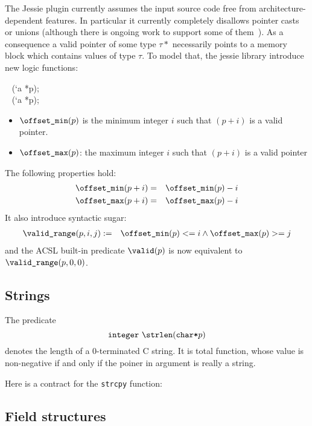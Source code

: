 The Jessie plugin currently assumes the input source code free from
architecture-dependent features. In particular it currently completely
disallows pointer casts or unions (although there is ongoing work to
support some of them~\cite{moy07ccpp}). As a consequence a valid
pointer of some type $\tau*$ necessarily points to a memory block
which contains values of type $\tau$. To model that, the jessie library introduce new logic functions:
\begin{flushleft}
\integer ~ \offsetmin(`a *p); \\
\integer ~ \offsetmax(`a *p);
\end{flushleft}

\begin{itemize}
\item $\texttt{{\textbackslash}offset\_min}(p)$ is the minimum integer $i$ such that $(p+i)$ is a
  valid pointer.

\item $\texttt{{\textbackslash}offset\_max}(p)$: the maximum integer $i$ such that $(p+i)$ is a
  valid pointer
\end{itemize}
The following properties hold:
\begin{eqnarray*}
\texttt{{\textbackslash}offset\_min}(p+i) &=& \texttt{{\textbackslash}offset\_min}(p)-i \\
\texttt{{\textbackslash}offset\_max}(p+i) &=& \texttt{{\textbackslash}offset\_max}(p)-i
\end{eqnarray*}
It also introduce syntactic sugar:
\begin{eqnarray*}
\texttt{{\textbackslash}valid\_range}(p,i,j) &:=& \texttt{{\textbackslash}offset\_min}(p) <= i \land \texttt{{\textbackslash}offset\_max}(p) >= j
\end{eqnarray*}
and the ACSL built-in predicate $\texttt{{\textbackslash}valid}(p)$ is now equivalent to
$\texttt{{\textbackslash}valid\_range}(p,0,0)$.

\subsection{Strings}

\experimental

The predicate
\[
\integer~\strlen(\verb|char*|p)
\]
denotes the length of a 0-terminated C string. It is total function,
whose value is non-negative if and only if the poiner in argument is
really a string.

\begin{example}
  Here is a contract for the \verb|strcpy| function:
  

\end{example}

\subsection{Field structures}

